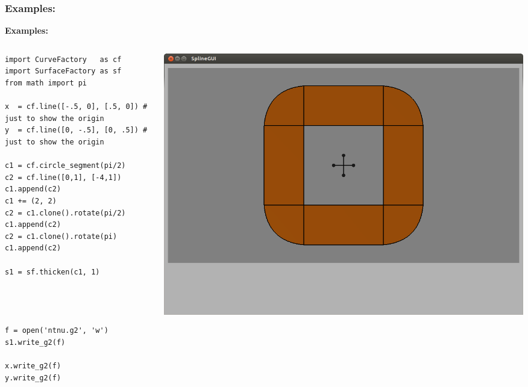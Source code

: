 \documentclass{beamer}
\theoremstyle{plain}
\theoremstyle{definition}
\begin{document}
\begin{frame}[fragile]
\frametitle{Examples:}
\textbf{Examples:}
\begin{columns}
    \begin{column}{.50\linewidth}
        \begin{listing}[H]
            \tiny
            \begin{verbatim}
import CurveFactory   as cf
import SurfaceFactory as sf
from math import pi

x  = cf.line([-.5, 0], [.5, 0]) # just to show the origin
y  = cf.line([0, -.5], [0, .5]) # just to show the origin

c1 = cf.circle_segment(pi/2)
c2 = cf.line([0,1], [-4,1])
c1.append(c2)
c1 += (2, 2)
c2 = c1.clone().rotate(pi/2)
c1.append(c2)
c2 = c1.clone().rotate(pi)
c1.append(c2)

s1 = sf.thicken(c1, 1)




f = open('ntnu.g2', 'w')
s1.write_g2(f)

x.write_g2(f)
y.write_g2(f)
            \end{verbatim}
        \end{listing}
    \end{column}
    \begin{column}{.45\linewidth}
        \includegraphics[width=\linewidth]{ntnu4}
    \end{column}
\end{columns}

\end{frame}

\end{document}
